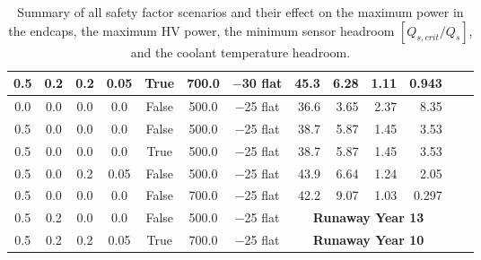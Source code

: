 \begin{table}[ht]
\begin{centering}
{\begin{tabular}{|ccccc|cc|rrrr|r|r|}
0.5     &     0.2 &   0.2 &  0.05 &  True & 700.0 &  $-$30 flat &      45.3 &    6.28 &      1.11 &      0.943 \\ \hline
0.0     &     0.0 &   0.0 &   0.0 & False & 500.0 &  $-$25 flat &      36.6 &    3.65 &      2.37 &       8.35 \\ 
0.5     &     0.0 &   0.0 &   0.0 & False & 500.0 &  $-$25 flat &      38.7 &    5.87 &      1.45 &       3.53 \\ 
0.5     &     0.0 &   0.0 &   0.0 &  True & 500.0 &  $-$25 flat &      38.7 &    5.87 &      1.45 &       3.53 \\ 
0.5     &     0.0 &   0.2 &  0.05 & False & 500.0 &  $-$25 flat &      43.9 &    6.64 &      1.24 &       2.05 \\ 
0.5     &     0.0 &   0.0 &   0.0 & False & 700.0 &  $-$25 flat &      42.2 &    9.07 &      1.03 &      0.297 \\ 
0.5     &     0.2 &   0.0 &   0.0 & False & 500.0 &  $-$25 flat & \multicolumn{4}{c|}{\bf Runaway Year 13} \\
0.5     &     0.2 &   0.2 &  0.05 &  True & 700.0 &  $-$25 flat & \multicolumn{4}{c|}{\bf Runaway Year 10} \\
\hline\end{tabular}
} %
\caption{Summary of all safety factor scenarios and their effect on the maximum power in the
endcaps, the maximum HV power, the minimum sensor headroom $[Q_{s,crit}/Q_s]$, and the coolant temperature headroom.}
\label{detailed_safety_table}
\end{centering}
\end{table}
